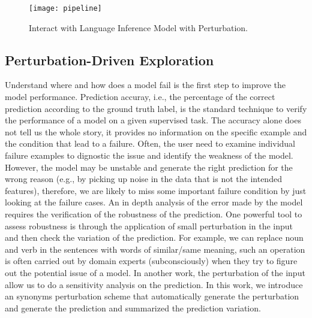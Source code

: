 \begin{figure}[htbp]
\centering
\vspace{-2mm}
 \texttt{[image: pipeline]}
 \caption{Interact with Language Inference Model with Perturbation.}
\label{fig:modelPipeline}
\end{figure}

\subsection{Perturbation-Driven Exploration}


Understand where and how does a model fail is the first step to improve the
model performance.
Prediction accuray, i.e., the percentage of the correct prediction according to
the ground truth label, is the standard technique to verify the performance
of a model on a given supervised task.
%
The accuracy alone does not tell us the whole story, it provides no
information on the specific example and the condition that lead to a failure.
%
Often, the user need to examine individual failure examples to dignostic the
issue and identify the weakness of the model.
%
However, the model may be unstable and generate the right prediction for the wrong
reason (e.g., by picking up noise in the data that is not the intended features),
therefore, we are likely to miss some important failure condition by just looking
at the failure cases.
%
An in depth analysis of the error made by the model requires the verification of
the robustness of the prediction.
%
One powerful tool to assess robustness is through the application of small
perturbation in the input and then check the variation of the prediction.
%
For example, we can replace noun and verb in the sentences with words of
similar/same meaning, such an operation is often carried out by domain experts
(subconsciously) when they try to figure out the potential issue of a model.
%
In another work, the perturbation of the input allow us to do a sensitivity
analysis on the prediction.
%
In this work, we introduce an synonyms perturbation scheme that automatically
generate the perturbation and generate the prediction and summarized the prediction
variation.
%



